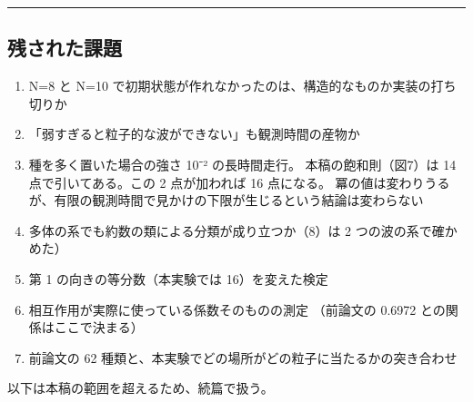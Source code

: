 \documentclass[
]{ltjsarticle}
\providecommand{\tightlist}{%
  \setlength{\itemsep}{0pt}\setlength{\parskip}{0pt}}
\begin{document}
\begin{center}\rule{0.5\linewidth}{0.5pt}\end{center}

\subsection{残された課題}\label{ux6b8bux3055ux308cux305fux8ab2ux984c}

\begin{enumerate}
\def\labelenumi{\arabic{enumi}.}
\tightlist
\item
  N=8 と N=10
  で初期状態が作れなかったのは、構造的なものか実装の打ち切りか
\item
  「弱すぎると粒子的な波ができない」も観測時間の産物か
\item
  種を多く置いた場合の強さ 10⁻² の長時間走行。 本稿の飽和則（図7）は 14
  点で引いてある。この 2 点が加われば 16 点になる。
  冪の値は変わりうるが、有限の観測時間で見かけの下限が生じるという結論は変わらない
\item
  多体の系でも約数の類による分類が成り立つか（8）は 2
  つの波の系で確かめた）
\item
  第 1 の向きの等分数（本実験では 16）を変えた検定
\item
  相互作用が実際に使っている係数そのものの測定 （前論文の 0.6972
  との関係はここで決まる）
\item
  前論文の 62 種類と、本実験でどの場所がどの粒子に当たるかの突き合わせ
\end{enumerate}

以下は本稿の範囲を超えるため、続篇で扱う。
\end{document}
